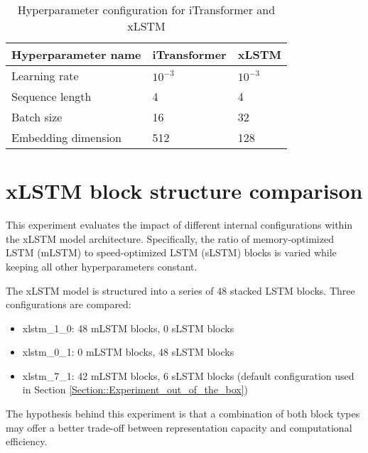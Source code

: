 \documentclass[class=scrbook, crop=false]{standalone}
\begin{document}


\begin{table}[]
\centering
\begin{tabular}{l|l|l}
 Hyperparameter name & iTransformer & xLSTM   \\\hline
 Learning rate & $10^{-3}$ & $10^{-3} $ \\
 Sequence length & 4 & 4  \\
 Batch size & 16 & 32  \\
 Embedding dimension & 512 & 128  \\
 
\end{tabular}
\caption{Hyperparameter configuration for iTransformer and xLSTM}
\label{Table::Raw_hyperparameters}
\end{table}

\section{xLSTM block structure comparison}

This experiment evaluates the impact of different internal configurations within the xLSTM model architecture. Specifically, the ratio of memory-optimized LSTM (mLSTM) to speed-optimized LSTM (sLSTM) blocks is varied while keeping all other hyperparameters constant.

The xLSTM model is structured into a series of 48 stacked LSTM blocks. Three configurations are compared:
\begin{itemize}
\item xlstm\_1\_0: 48 mLSTM blocks, 0 sLSTM blocks
\item xlstm\_0\_1: 0 mLSTM blocks, 48 sLSTM blocks
\item xlstm\_7\_1: 42 mLSTM blocks, 6 sLSTM blocks (default configuration used in Section \ref{Section::Experiment_out_of_the_box})
\end{itemize}
The hypothesis behind this experiment is that a combination of both block types may offer a better trade-off between representation capacity and computational efficiency.
\end{document}
